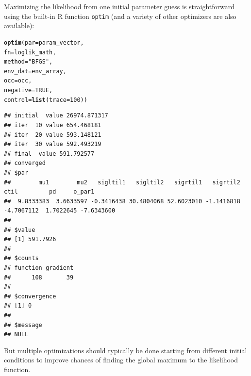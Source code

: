 \documentclass[11pt]{article}\usepackage[]{graphicx}\usepackage[]{xcolor}
\makeatletter
\newcommand{\hlnum}[1]{\textcolor[rgb]{0.686,0.059,0.569}{#1}}%
\newcommand{\hlsng}[1]{\textcolor[rgb]{0.192,0.494,0.8}{#1}}%
\newcommand{\hldef}[1]{\textcolor[rgb]{0.345,0.345,0.345}{#1}}%
\newcommand{\hlkwc}[1]{\textcolor[rgb]{0.333,0.667,0.333}{#1}}%
\newcommand{\hlkwd}[1]{\textcolor[rgb]{0.737,0.353,0.396}{\textbf{#1}}}%
\newenvironment{kframe}{%
 \def\at@end@of@kframe{}%
 \ifinner\ifhmode%
  \def\at@end@of@kframe{\end{minipage}}%
  \begin{minipage}{\columnwidth}%
 \fi\fi%
 \def\FrameCommand##1{\hskip\@totalleftmargin \hskip-\fboxsep
 \colorbox{shadecolor}{##1}\hskip-\fboxsep
     \hskip-\linewidth \hskip-\@totalleftmargin \hskip\columnwidth}%
 \MakeFramed {\advance\hsize-\width
   \@totalleftmargin\z@ \linewidth\hsize
   \@setminipage}}%
 {\par\unskip\endMakeFramed%
 \at@end@of@kframe}
\newenvironment{knitrout}{}{} %
\makeatother
\begin{document}
Maximizing the likelihood from one initial parameter guess is straightforward using the built-in
R function \texttt{optim} (and a variety of other optimizers are also available):
\begin{knitrout}
\color{fgcolor}\begin{kframe}
\begin{alltt}
\hlkwd{optim}\hldef{(}\hlkwc{par} \hldef{= param_vector,}
      \hlkwc{fn} \hldef{= loglik_math,}
      \hlkwc{method} \hldef{=} \hlsng{"BFGS"}\hldef{,}
      \hlkwc{env_dat} \hldef{= env_array,}
      \hlkwc{occ} \hldef{= occ,}
      \hlkwc{negative} \hldef{=} \hlnum{TRUE}\hldef{,}
      \hlkwc{control} \hldef{=} \hlkwd{list}\hldef{(}\hlkwc{trace}\hldef{=}\hlnum{100}\hldef{))}
\end{alltt}
\begin{verbatim}
## initial  value 26974.871317 
## iter  10 value 654.468181
## iter  20 value 593.148121
## iter  30 value 592.493219
## final  value 591.792577 
## converged
## $par
##        mu1        mu2   sigltil1   sigltil2   sigrtil1   sigrtil2       ctil         pd     o_par1 
##  9.8333383  3.6633597 -0.3416438 30.4804068 52.6023010 -1.1416818 -4.7067112  1.7022645 -7.6343600 
## 
## $value
## [1] 591.7926
## 
## $counts
## function gradient 
##      108       39 
## 
## $convergence
## [1] 0
## 
## $message
## NULL
\end{verbatim}
\end{kframe}
\end{knitrout}
\noindent But multiple optimizations should typically be done starting from different 
initial conditions to improve chances of finding the global maximum to the likelihood
function. 
\end{document}
